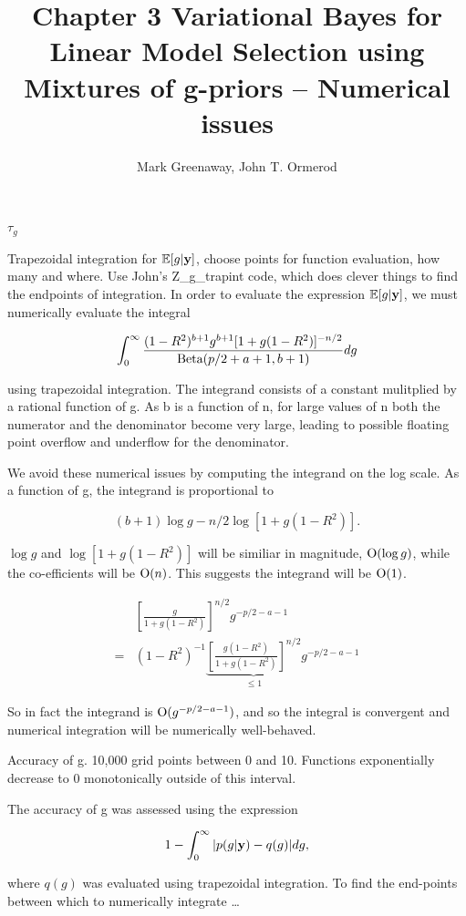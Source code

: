\documentclass{amsart}[12pt]
\title{Chapter 3 Variational Bayes for Linear Model Selection using Mixtures of g-priors -- Numerical issues}
\author{Mark Greenaway, John T. Ormerod}
\newcommand{\mgc}[1]{{\color{blue}#1}}
\begin{document}
\maketitle

$\tau_g$

\mgc{Trapezoidal integration for $\mathbb{E}[g | {\bf y}]$, choose points for function evaluation, how many and where. Use
John's Z\_g\_trapint code, which does clever things to find the endpoints of integration.
}
In order to evaluate the expression $\mathbb{E}[g | {\bf y}]$, we must numerically evaluate the integral

\[
	\int_0^\infty \frac{(1-R^2)^{b+1} g^{b+1} [1 + g(1 - R^2)]^{-n/2}}{\text{Beta}(p/2 + a + 1, b + 1)} dg
\]

using trapezoidal integration. The integrand consists of a constant mulitplied by a rational function of g. As
b is a function of n, for large values of n both the numerator and the denominator become very large, leading
to possible floating point overflow and underflow for the denominator.

We avoid these numerical issues by computing the integrand on the log scale. As a function of g, the integrand
is proportional to

\[
	(b + 1) \log{g} - n / 2 \log{[1 + g(1 - R^2)]}.
\]

$\log{g}$ and $\log{[1 + g(1 - R^2)]}$ will be similiar in magnitude, $\text{O}{(\log{g})}$, while the
co-efficients will be $\text{O}{(n)}$. This suggests the integrand will be $\text{O}{(1)}$.

\begin{align*}
	&\left[\frac{g}{1 + g(1 - R^2)}\right]^{n/2} g^{-p/2 -a - 1} \\
	=&(1 - R^2)^{-1} \underbrace{\left[\frac{g(1 - R^2)}{1 + g(1 - R^2)}\right]^{n/2}}_{ \leq 1} g^{-p/2 - a - 1}
\end{align*}

So in fact the integrand is $\text{O}{(g^{-p/2 - a - 1})}$, and so the integral is convergent and numerical
integration will be numerically well-behaved.

\mgc{Accuracy of g. 10,000 grid points between 0 and 10. Functions exponentially decrease to 0 monotonically
outside of this interval.
}

The accuracy of g was assessed using the expression

\[
	1 - \int_0^\infty |p(g | {\bf y}) - q(g)| dg,
\]

where $q(g)$ was evaluated using trapezoidal integration. To find the end-points between which to numerically
integrate \ldots
\end{document}
